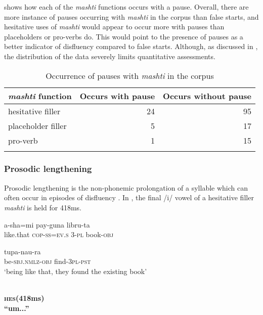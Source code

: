 \documentclass[output=paper]{langscibook}
\begin{document}
 shows how each of the \textit{mashti} functions occurs with a pause. Overall, there are more instance of pauses occurring with \textit{mashti} in the corpus than false starts, and hesitative uses of \textit{mashti} would appear to occur more with pauses than placeholders or pro-verbs do. This would point to the presence of pauses as a better indicator of disfluency compared to false starts. Although, as discussed in , the distribution of the data severely limits quantitative assessments.

\begin{table}
\begin{tabular}{lrr}
\lsptoprule
\textit{mashti} function & Occurs with pause & Occurs without pause\\
\midrule
hesitative filler & 24 & 95\\
placeholder filler & 5 & 17\\
pro-verb & 1 & 15\\
\lspbottomrule
\end{tabular}
\caption{\label{tab:rice:8} Occurrence of pauses with \textit{mashti} in the corpus}
\end{table}

\subsubsection{Prosodic lengthening}
\label{sec:rice:4.1.3}
Prosodic lengthening is the non-phonemic prolongation of a syllable which can often occur in episodes of disfluency \citep[458]{Lickley2015}. In , the final /i/ vowel of a hesitative filler \textit{mashti} is held for 418ms. 

\ea%
\label{ex:rice:25}
\ea \label{ex:rice:25a}
 {a-sha=mi} {pay-guna}  {libru-ta} \\
{like.that} {\textsc{cop-ss=ev.s}}  {3-\textsc{pl}} {book-\textsc{obj}}\\
\medskip

 {tupa-nau-ra}\\
{be-\textsc{sbj.nmlz-obj}} {find-\textsc{3pl-pst}}\\
\glt ‘being like that, they found the existing book’
\medskip

\ex \label{ex:rice:25b}
 {}\\
{\textbf{\textsc{hes}}{\textbf{(418ms)}}} {}\\
\glt \textbf{“um...”}
\medskip
\end{document}
